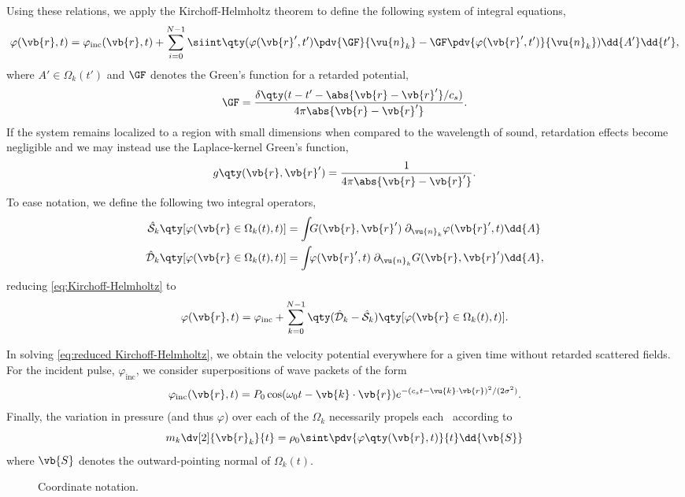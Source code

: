 Using these relations, we apply the Kirchoff-Helmholtz theorem to define the following system of integral equations,
\begin{equation}
  \varphi(\vb{r}, t) = \varphi_\text{inc}(\vb{r}, t) + \sum_{i = 0}^{N - 1} \siint
  \qty( \varphi(\vb{r}',t') \pdv{\GF}{\vu{n}_k} - \GF \pdv{\varphi(\vb{r}',t')}{\vu{n}_k} ) \dd{A'} \dd{t'},
  \label{eq:Kirchoff-Helmholtz}
\end{equation}
where $A' \in \Omega_k(t')$ and $\GF$ denotes the Green's function for a retarded potential,
\begin{equation}
  \GF = \frac{\delta\qty(t - t' - \abs{\vb{r}-\vb{r}'}/c_s)}{4\pi \abs{\vb{r}-\vb{r}'}}.
  \label{eq:retarded green's function}
\end{equation}
If the system remains localized to a region with small dimensions when compared to the wavelength of sound, retardation effects become negligible and we may instead use the Laplace-kernel Green's function,
\begin{equation}
  g\qty(\vb{r}, \vb{r}') = \frac{1}{4\pi\abs{\vb{r} - \vb{r}'}}.
  \label{eq:green's function}
\end{equation}
To ease notation, we define the following two integral operators,
\begin{subequations}
\begin{align}
  \hat{\mathcal{S}}_k\qty[\varphi(\vb{r} \in \Omega_k(t), t)] &= \int_{} G(\vb{r}, \vb{r}') \; \partial_{\vu{n}_k} \varphi(\vb{r}',t) \dd{A}
  \label{eq:single layer}\\
  \hat{\mathcal{D}}_k\qty[\varphi(\vb{r} \in \Omega_k(t), t)] &= \int_{} \varphi(\vb{r}',t) \; \partial_{\vu{n}_k} G(\vb{r}, \vb{r}') \dd{A}, \label{eq:double layer}
\end{align}
  \label{eq:operator_kirchoff}
\end{subequations}
reducing \cref{eq:Kirchoff-Helmholtz} to
\begin{equation}
  \varphi(\vb{r},t) = \varphi_\text{inc} + \sum_{k = 0}^{N - 1} \qty(\hat{\mathcal{D}}_k - \hat{\mathcal{S}}_k)\qty[\varphi(\vb{r} \in \Omega_k(t), t)].
  \label{eq:reduced Kirchoff-Helmholtz}
\end{equation}

In solving \cref{eq:reduced Kirchoff-Helmholtz}, we obtain the velocity potential everywhere for a given time without retarded scattered fields.
For the incident pulse, $\varphi_\text{inc}$, we consider superpositions of wave packets of the form
\begin{equation}
  \varphi_\text{inc}(\vb{r}, t) = P_0\cos(\omega_0 t - \vb{k}\cdot\vb{r})e^{-{(c_s t - \vu{k}\cdot\vb{r})}^2/(2 \sigma^2)}.
  \label{eq:inc_field}
\end{equation}
Finally, the variation in pressure (and thus $\varphi$) over each of the $\Omega_k$ necessarily propels each \bubble\ according to
\begin{equation}
  m_k \dv[2]{\vb{r}_k}{t} = \rho_0 \sint \pdv{\varphi\qty(\vb{r}, t)}{t} \dd{\vb{S}}
  \label{eq:Newton}
\end{equation}
where $\vb{S}$ denotes the outward-pointing normal of $\Omega_k(t)$.

\begin{figure}[t]
  \centering
  \caption{\label{fig:diagram}Coordinate notation.}
\end{figure}
